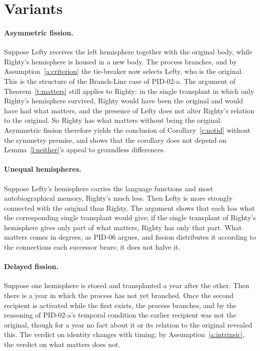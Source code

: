 \documentclass{situationist-preprint}
\begin{document}
\section{Variants}\label{s:var}

\paragraph{Asymmetric fission.} Suppose Lefty receives the left hemisphere together with the original body, while Righty's hemisphere is housed in a new body. The process branches, and by Assumption~\ref{a:criterion} the tie-breaker now selects Lefty, who is the original. This is the structure of the Branch-Line case of PID-02-a. The argument of Theorem~\ref{t:matters} still applies to Righty: in the single transplant in which only Righty's hemisphere survived, Righty would have been the original and would have had what matters, and the presence of Lefty does not alter Righty's relation to the original. So Righty has what matters without being the original. Asymmetric fission therefore yields the conclusion of Corollary~\ref{c:notid} without the symmetry premise, and shows that the corollary does not depend on Lemma~\ref{l:neither}'s appeal to groundless differences.

\paragraph{Unequal hemispheres.} Suppose Lefty's hemisphere carries the language functions and most autobiographical memory, Righty's much less. Then Lefty is more strongly connected with the original than Righty. The argument shows that each has what the corresponding single transplant would give; if the single transplant of Righty's hemisphere gives only part of what matters, Righty has only that part. What matters comes in degrees, as PID-06 argues, and fission distributes it according to the connections each successor bears; it does not halve it.

\paragraph{Delayed fission.} Suppose one hemisphere is stored and transplanted a year after the other. Then there is a year in which the process has not yet branched. Once the second recipient is activated while the first exists, the process branches, and by the reasoning of PID-02-a's temporal condition the earlier recipient was not the original, though for a year no fact about it or its relation to the original revealed this. The verdict on identity changes with timing; by Assumption~\ref{a:intrinsic}, the verdict on what matters does not.
\end{document}
